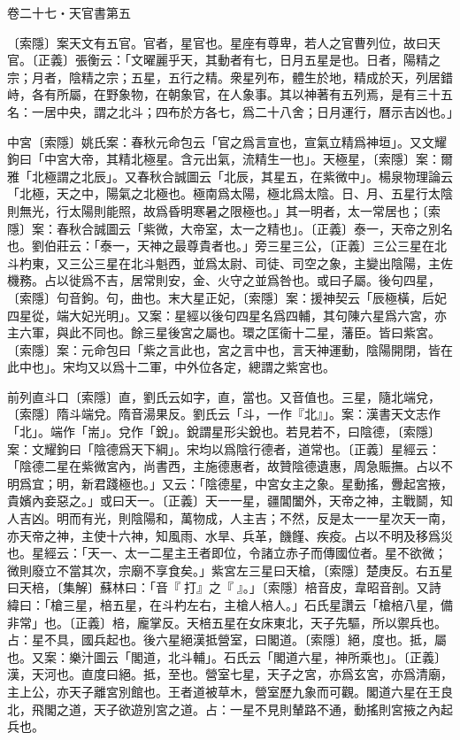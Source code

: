 卷二十七・天官書第五

〔索隱〕案天文有五官。官者，星官也。星座有尊卑，若人之官曹列位，故曰天官。〔正義〕張衡云：「文曜麗乎天，其動者有七，日月五星是也。日者，陽精之宗；月者，陰精之宗；五星，五行之精。衆星列布，體生於地，精成於天，列居錯峙，各有所屬，在野象物，在朝象官，在人象事。其以神著有五列焉，是有三十五名：一居中央，謂之北斗；四布於方各七，爲二十八舍；日月運行，曆示吉凶也。」

中宮〔索隱〕姚氏案：春秋元命包云「官之爲言宣也，宣氣立精爲神垣」。又文耀鉤曰「中宮大帝，其精北極星。含元出氣，流精生一也」。天極星，〔索隱〕案：爾雅「北極謂之北辰」。又春秋合誠圖云「北辰，其星五，在紫微中」。楊泉物理論云「北極，天之中，陽氣之北極也。極南爲太陽，極北爲太陰。日、月、五星行太陰則無光，行太陽則能照，故爲昏明寒暑之限極也。」其一明者，太一常居也；〔索隱〕案：春秋合誠圖云「紫微，大帝室，太一之精也」。〔正義〕泰一，天帝之別名也。劉伯莊云：「泰一，天神之最尊貴者也。」旁三星三公，〔正義〕三公三星在北斗杓東，又三公三星在北斗魁西，並爲太尉、司徒、司空之象，主變出陰陽，主佐機務。占以徙爲不吉，居常則安，金、火守之並爲咎也。或曰子屬。後句四星，〔索隱〕句音鉤。句，曲也。末大星正妃，〔索隱〕案：援神契云「辰極橫，后妃四星從，端大妃光明」。又案：星經以後句四星名爲四輔，其句陳六星爲六宮，亦主六軍，與此不同也。餘三星後宮之屬也。環之匡衞十二星，藩臣。皆曰紫宮。〔索隱〕案：元命包曰「紫之言此也，宮之言中也，言天神運動，陰陽開閉，皆在此中也」。宋均又以爲十二軍，中外位各定，總謂之紫宮也。

前列直斗口〔索隱〕直，劉氏云如字，直，當也。又音值也。三星，隨北端兌，〔索隱〕隋斗端兌。隋音湯果反。劉氏云「斗，一作『北』」。案：漢書天文志作「北」。端作「耑」。兌作「銳」。銳謂星形尖銳也。若見若不，曰陰德，〔索隱〕案：文耀鉤曰「陰德爲天下綱」。宋均以爲陰行德者，道常也。〔正義〕星經云：「陰德二星在紫微宮內，尚書西，主施德惠者，故贊陰德遺惠，周急賑撫。占以不明爲宜；明，新君踐極也。」又云：「陰德星，中宮女主之象。星動搖，釁起宮掖，貴嬪內妾惡之。」或曰天一。〔正義〕天一一星，疆閶闔外，天帝之神，主戰鬬，知人吉凶。明而有光，則陰陽和，萬物成，人主吉；不然，反是太一一星次天一南，亦天帝之神，主使十六神，知風雨、水旱、兵革，饑饉、疾疫。占以不明及移爲災也。星經云：「天一、太一二星主王者即位，令諸立赤子而傳國位者。星不欲微；微則廢立不當其次，宗廟不享食矣。」紫宮左三星曰天槍，〔索隱〕楚庚反。右五星曰天棓，〔集解〕蘇林曰：「音『𣘙打』之『𣘙』。」〔索隱〕棓音皮，韋昭音剖。又詩緯曰：「槍三星，棓五星，在斗杓左右，主槍人棓人。」石氏星讚云「槍棓八星，備非常」也。〔正義〕棓，龐掌反。天棓五星在女床東北，天子先驅，所以禦兵也。占：星不具，國兵起也。後六星絕漢抵營室，曰閣道。〔索隱〕絕，度也。抵，屬也。又案：樂汁圖云「閣道，北斗輔」。石氏云「閣道六星，神所乘也」。〔正義〕漢，天河也。直度曰絕。抵，至也。營室七星，天子之宮，亦爲玄宮，亦爲清廟，主上公，亦天子離宮別館也。王者道被草木，營室歷九象而可觀。閣道六星在王良北，飛閣之道，天子欲遊別宮之道。占：一星不見則輦路不通，動搖則宮掖之內起兵也。

